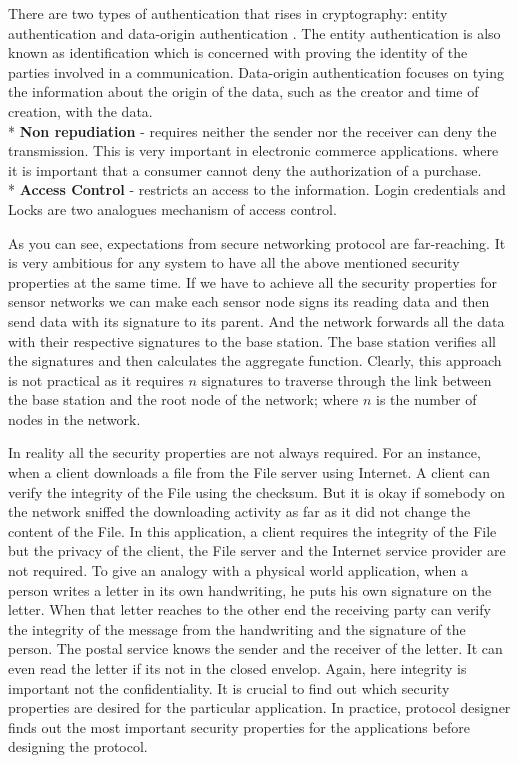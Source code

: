 	There are two types of authentication that rises in cryptography: entity authentication and data-origin authentication \cite{trappe2006introduction}.
	The entity authentication is also known as identification which is concerned with proving the identity of the parties involved in a communication.
	Data-origin authentication focuses on tying the information about the origin of the data, such as the creator and time of creation, with the data.\\*
	\textbf{Non repudiation} - requires neither the sender nor the receiver can deny the transmission.
	This is very important in electronic commerce applications. where it is important that a consumer cannot deny the authorization of a purchase.
	\\*
	\textbf{Access Control} - restricts an access to the information.
	Login credentials and Locks are two analogues mechanism of access control.

	As you can see, expectations from secure networking protocol are far-reaching.
	It is very ambitious for any system to have all the above mentioned security properties at the same time.
	If we have to achieve all the security properties for sensor networks we can make each sensor node signs its reading data and then send data with its signature to its parent.
	And the network forwards all the data with their respective signatures to the base station.
	The base station verifies all the signatures and then calculates the aggregate function.
	Clearly, this approach is not practical as it requires $n$ signatures to traverse through the link between the base station and the root node of the network; where $n$ is the number of nodes in the network.

	In reality all the security properties are not always required.
	For an instance, when a client downloads a file from the File server using Internet.
	A client can verify the integrity of the File using the checksum.
	But it is okay if somebody on the network sniffed the downloading activity as far as it did not change the content of the File.
	In this application, a client requires the integrity of the File but the privacy of the client, the File server and the Internet service provider are not required.
	To give an analogy with a physical world application, when a person writes a letter in its own handwriting, he puts his own signature on the letter. 
	When that letter reaches to the other end the receiving party can verify the integrity of the message from the handwriting and the signature of the person.
	The postal service knows the sender and the receiver of the letter.
	It can even read the letter if its not in the closed envelop.
	Again, here integrity is important not the confidentiality.
	It is crucial to find out which security properties are desired for the particular application.
	In practice, protocol designer finds out the most important security properties for the applications before designing the protocol.

